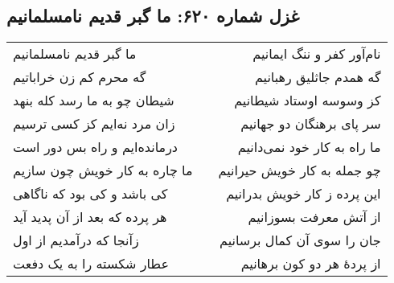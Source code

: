 \begin{center}
\section*{غزل شماره ۶۲۰: ما گبر قدیم نامسلمانیم}
\label{sec:620}
\begin{longtable}{l p{0.5cm} r}
ما گبر قدیم نامسلمانیم
&&
نام‌آور کفر و ننگ ایمانیم
\\
گه محرم کم زن خراباتیم
&&
گه همدم جاثلیق رهبانیم
\\
شیطان چو به ما رسد کله بنهد
&&
کز وسوسه اوستاد شیطانیم
\\
زان مرد نه‌ایم کز کسی ترسیم
&&
سر پای برهنگان دو جهانیم
\\
درمانده‌ایم و راه بس دور است
&&
ما راه به کار خود نمی‌دانیم
\\
ما چاره به کار خویش چون سازیم
&&
چو جمله به کار خویش حیرانیم
\\
کی باشد و کی بود که ناگاهی
&&
این پرده ز کار خویش بدرانیم
\\
هر پرده که بعد از آن پدید آید
&&
از آتش معرفت بسوزانیم
\\
زآنجا که درآمدیم از اول
&&
جان را سوی آن کمال برسانیم
\\
عطار شکسته را به یک دفعت
&&
از پردهٔ هر دو کون برهانیم
\\
\end{longtable}
\end{center}
